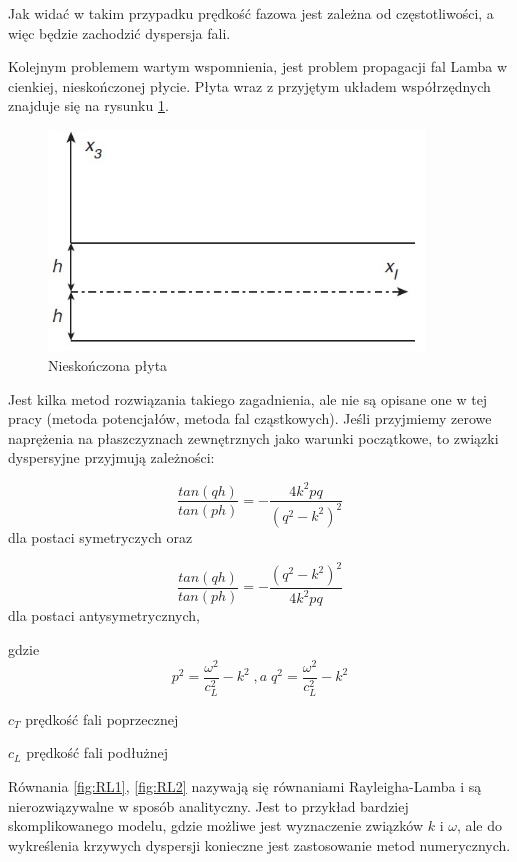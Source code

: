 Jak widać w takim przypadku prędkość fazowa jest zależna od częstotliwości, a więc będzie zachodzić dyspersja fali.

\vspace{3mm}

Kolejnym problemem wartym wspomnienia, jest problem propagacji fal Lamba w cienkiej, nieskończonej płycie. Płyta wraz z przyjętym układem współrzędnych znajduje się na rysunku \ref{fig:nieskonczona_plyta}.

\begin{figure}[h]
\centering
\includegraphics[width=10cm]{Zdjecia/2/dyspersja_analitycznie_plyta}
\caption{Nieskończona płyta \cite{bartek_rose}}
\label{fig:nieskonczona_plyta}
\end{figure}

Jest kilka metod rozwiązania takiego zagadnienia, ale nie są opisane one w tej pracy (metoda potencjałów, metoda fal cząstkowych). Jeśli przyjmiemy zerowe naprężenia na płaszczyznach zewnętrznych jako warunki początkowe, to związki dyspersyjne przyjmują zależności:

\begin{equation}\label{fig:RL1}
\frac{tan(qh)}{tan(ph)}=-\frac{4k^2pq}{(q^2-k^2)^2}
\end{equation}
dla postaci symetryczych oraz

\begin{equation}\label{fig:RL2}
\frac{tan(qh)}{tan(ph)}=-\frac{(q^2-k^2)^2}{4k^2pq}
\end{equation}
dla postaci antysymetrycznych,

gdzie
\begin{equation}
p^2=\frac{\omega^2}{c_L^2} - k^2 \; ,a \; q^2=\frac{\omega^2}{c_L^2}-k^2
\end{equation}

\begin{eqwhere}[2cm]
        \item[$c_T$] prędkość fali poprzecznej
	\item[$c_L$] prędkość fali podłużnej
\end{eqwhere}

Równania \ref{fig:RL1}, \ref{fig:RL2} nazywają się równaniami Rayleigha-Lamba i są nierozwiązywalne w sposób analityczny. Jest to przykład bardziej skomplikowanego modelu, gdzie możliwe jest wyznaczenie związków \(k\) i \(\omega\), ale do wykreślenia krzywych dyspersji konieczne jest zastosowanie metod numerycznych.
